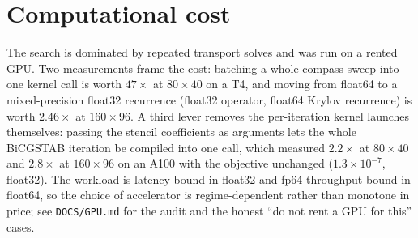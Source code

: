 \section{Computational cost}

The search is dominated by repeated transport solves and was run on a rented GPU.
Two measurements frame the cost: batching a whole compass sweep into one kernel
call is worth $47\times$ at $80\times40$ on a T4, and moving from float64 to a
mixed-precision float32 recurrence (float32 operator, float64 Krylov recurrence)
is worth $2.46\times$ at $160\times96$.  A third lever removes the per-iteration
kernel launches themselves: passing the stencil coefficients as arguments lets the
whole BiCGSTAB iteration be compiled into one call, which measured $2.2\times$ at
$80\times40$ and $2.8\times$ at $160\times96$ on an A100 with the objective
unchanged ($1.3\times10^{-7}$, float32).  The workload is latency-bound in float32
and fp64-throughput-bound in float64, so the choice of accelerator is
regime-dependent rather than monotone in price; see \texttt{DOCS/GPU.md} for the
audit and the honest ``do not rent a GPU for this'' cases.
